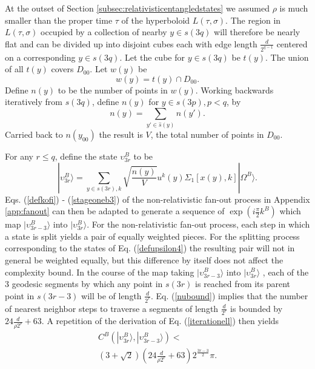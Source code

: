 \documentclass[12pt,amsmath,amssymb,onecolumn]{revtex4-2}
\begin{document}
At the outset of Section \ref{subsec:relativisticentangledstates} we assumed $\rho$ is much
smaller than the proper time $\tau$ of the hyperboloid $L( \tau, \sigma)$.
The region in $L( \tau, \sigma)$ occupied by a collection of nearby $y \in s(3q)$ will
therefore be
nearly flat and can
be divided up into disjoint cubes each with edge length $\frac{d}{2^{q-1}}$ centered on a
corresponding $y \in s(3q)$. Let the cube for $y \in s(3q)$ be
$t(y)$. The union of all $t(y)$ covers $D_{00}$. Let $w(y)$ be 
\begin{equation}
  \label{defwy}
  w(y) = t(y) \cap D_{00}.
\end{equation}
Define $n(y)$ to be the number of points in $w(y)$. Working backwards iteratively from $s(3q)$,
define $n(y)$ for $y \in s(3p), p < q$, by
\begin{equation}
  \label{defbarwy}
  n(y) = \sum_{y' \in \hat{s}(y)} n(y').
\end{equation}
Carried back to $n(y_{00})$ the result is $V$, the total
number of points in $D_{00}$.

For any $r \le q$, define the state $\upsilon^B_{3r}$ to be
\begin{equation}
\label{defupsilon4}
|\upsilon^B_{3r} \rangle  = \sum_{y \in s(3r), k}\sqrt{ \frac{n(y)}{V}} u^k(y) \Sigma_1[x( y), k] |\Omega^B \rangle .
\end{equation}
Eqs. (\ref{defkofi}) - (\ref{stageoneb3}) of 
the non-relativistic
fan-out process in Appendix \ref{app:fanout} can then be adapted to
generate a sequence of $\exp( i \frac{\pi}{2} k^B)$ which map 
$|\upsilon^B_{3r-3} \rangle $ into $|\upsilon^B_{3r} \rangle $.
For the non-relativistic fan-out process, each 
step in which a state is split yields 
a pair of equally weighted pieces. For the splitting
process corresponding to the states of Eq. (\ref{defupsilon4}) the
resulting pair will not in general be weighted equally, but
this difference by itself does not affect the complexity bound.
In the course of the map taking $|\upsilon^B_{3r-3} \rangle $ into $|\upsilon^B_{3r} \rangle $ , each of the 3
geodesic segments by which any point in $s(3r)$ is reached
from its parent point in $s(3r - 3)$ will
be of length $\frac{d}{2^r}$. 
Eq. (\ref{nubound}) implies that the number of nearest neighbor
steps to traverse a segments of length $\frac{d}{2^r}$ is
bounded by $ 24 \frac{d}{\rho 2^r} + 63$.
A repetition of the derivation of Eq. (\ref{iterationell}) 
then yields
\begin{multline}
\label{iterationellr}
C^B( |\upsilon^B_{3 r} \rangle , |\upsilon^B_{3 r - 3} \rangle ) < \\ (3+\sqrt{2})( 24 \frac{d}{\rho 2^r} + 63) 2^{\frac{3r-3}{2}} \pi.
\end{multline}
\end{document}

